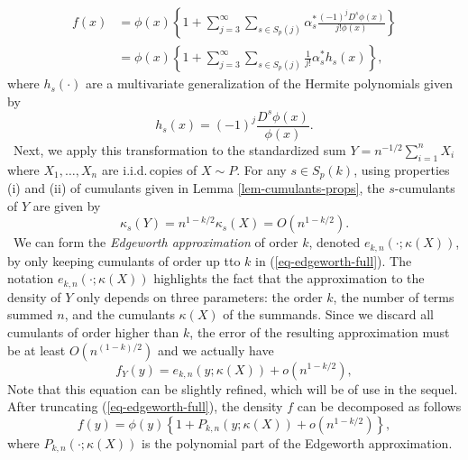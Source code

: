 \begin{align}
    f(x) 
    &= \phi(x) \left\{ 1 + \sum_{j=3}^\infty 
    \sum_{s \in S_p(j)}
    \alpha^*_s \frac{(-1)^j D^s \phi(x)}{j! \phi(x)}\right\} \nonumber \\
    &= \phi(x) \left\{
        1 + \sum_{j=3}^\infty  \sum_{s \in S_p(j)} \frac{1}{j!}\alpha^*_s h_s(x)
    \right\}, \label{eq-edgeworth-full}
\end{align} 
where $h_s(\cdot)$ are a multivariate generalization of the Hermite polynomials given by
\begin{equation*}
    h_s(x) = (-1)^j \frac{D^s \phi(x)}{\phi(x)}.
\end{equation*}
\
Next, we apply this transformation to the standardized sum $Y = n^{-1/2}\sum_{i=1}^n X_i$ where $X_1, \ldots, X_n$ are i.i.d.\,copies of $X \sim P$. For any $s \in S_p(k)$, using properties (i) and (ii) of cumulants given in Lemma \ref{lem-cumulants-props}, the $s$-cumulants of $Y$ are given by 
\begin{equation*}
    \kappa_s(Y) = n^{1-k/2} \kappa_s(X) = O(n^{1-k/2}).
\end{equation*}
\
We can form the \textit{Edgeworth approximation} of order $k$, denoted $e_{k, n}(\cdot; \kappa(X))$, by only keeping cumulants of order up tto $k$ in (\ref{eq-edgeworth-full}). The notation $e_{k, n}(\cdot; \kappa(X))$ highlights the fact that the approximation to the density of $Y$ only depends on three parameters: the order $k$, the number of terms summed $n$, and the cumulants $\kappa(X)$ of the summands. Since we discard all cumulants of order higher than $k$, the error of the resulting approximation must be at least $O(n^{(1-k)/2})$ and we actually have
\begin{equation} \label{eq-edgeworth}
    f_Y(y) = e_{k, n}(y; \kappa(X)) + o(n^{1-k/2}),
\end{equation}
Note that this equation can be slightly refined, which will be of use in the sequel. After truncating (\ref{eq-edgeworth-full}), the density $f$ can be decomposed as follows
\begin{equation} \label{eq-edge-polynomial}
    f(y) = \phi(y)\left\{1 + P_{k, n}(y; \kappa(X)) + o(n^{1-k/2})\right\},
\end{equation}
where $P_{k, n}(\cdot; \kappa(X))$ is the polynomial part of the Edgeworth approximation.

